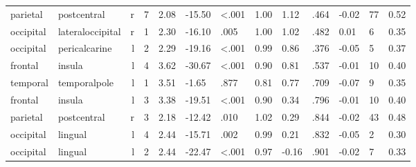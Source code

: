 \documentclass{article}
\begin{document}
\begin{longtable}{llrR{1.3cm}R{1cm}R{1.3cm}R{1cm}R{1cm}R{1.3cm}R{1cm}R{1.8cm}R{1.3cm}R{1.8cm}}
  parietal &               postcentral &    r &         7 &                  2.08 &           -15.50 &      \textless.001 &                               1.00 &                          1.12 &                            .464 &  -0.02 &     77 &      0.52 \\
 occipital &          lateraloccipital &    r &         1 &                  2.30 &           -16.10 &               .005 &                               1.00 &                          1.02 &                            .482 &   0.01 &      6 &      0.35 \\
 occipital &             pericalcarine &    l &         2 &                  2.29 &           -19.16 &      \textless.001 &                               0.99 &                          0.86 &                            .376 &  -0.05 &      5 &      0.37 \\
   frontal &                    insula &    l &         4 &                  3.62 &           -30.67 &      \textless.001 &                               0.90 &                          0.81 &                            .537 &  -0.01 &     10 &      0.40 \\
  temporal &              temporalpole &    l &         1 &                  3.51 &            -1.65 &               .877 &                               0.81 &                          0.77 &                            .709 &  -0.07 &      9 &      0.35 \\
   frontal &                    insula &    l &         3 &                  3.38 &           -19.51 &      \textless.001 &                               0.90 &                          0.34 &                            .796 &  -0.01 &     10 &      0.40 \\
  parietal &               postcentral &    r &         3 &                  2.18 &           -12.42 &               .010 &                               1.02 &                          0.29 &                            .844 &  -0.02 &     43 &      0.48 \\
 occipital &                   lingual &    l &         4 &                  2.44 &           -15.71 &               .002 &                               0.99 &                          0.21 &                            .832 &  -0.05 &      2 &      0.30 \\
 occipital &                   lingual &    l &         2 &                  2.44 &           -22.47 &      \textless.001 &                               0.97 &                         -0.16 &                            .901 &  -0.02 &      7 &      0.33 \\

\end{longtable}
\end{document}
